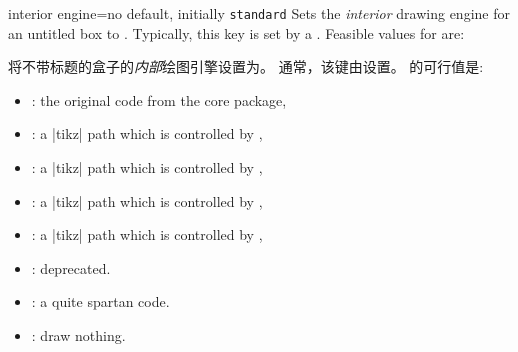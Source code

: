 \begin{docTcbKey}{interior engine}{=}{no default, initially \texttt{standard}}
Sets the \emph{interior} drawing engine for an untitled box to .
Typically, this key is set by a .
Feasible values for  are:

将不带标题的盒子的\emph{内部}绘图引擎设置为。
通常，该键由设置。
的可行值是:
  \begin{itemize}
  \item{}: the original code from the core package,
  \item{}: a |tikz| path which is controlled by ,
  \item{}: a |tikz| path which is controlled by ,
  \item{}: a |tikz| path which is controlled by ,
  \item{}: a |tikz| path which is controlled by ,
  \item{}: deprecated.
  \item{}: a quite spartan code.
  \item{}: draw nothing.
  \end{itemize}
\end{docTcbKey}

